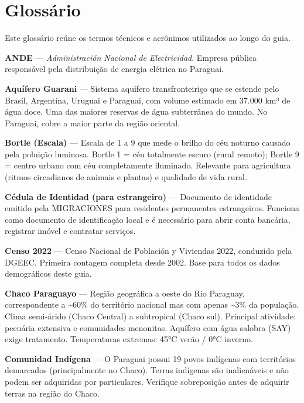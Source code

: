 \chapter*{Glossário}
\label{chap:glossario}

\small

\noindent Este glossário reúne os termos técnicos e acrônimos utilizados ao longo do guia.

\bigskip

\noindent\textbf{ANDE} — \textit{Administración Nacional de Electricidad}. Empresa pública responsável pela distribuição de energia elétrica no Paraguai.

\medskip
\noindent\textbf{Aquífero Guarani} — Sistema aquífero transfronteiriço que se estende pelo Brasil, Argentina, Uruguai e Paraguai, com volume estimado em 37.000 km³ de água doce. Uma das maiores reservas de água subterrânea do mundo. No Paraguai, cobre a maior parte da região oriental.

\medskip
\noindent\textbf{Bortle (Escala)} — Escala de 1 a 9 que mede o brilho do céu noturno causado pela poluição luminosa. Bortle 1 = céu totalmente escuro (rural remoto); Bortle 9 = centro urbano com céu completamente iluminado. Relevante para agricultura (ritmos circadianos de animais e plantas) e qualidade de vida rural.

\medskip
\noindent\textbf{Cédula de Identidad (para estrangeiro)} — Documento de identidade emitido pela MIGRACIONES para residentes permanentes estrangeiros. Funciona como documento de identificação local e é necessário para abrir conta bancária, registrar imóvel e contratar serviços.

\medskip
\noindent\textbf{Censo 2022} — Censo Nacional de Población y Viviendas 2022, conduzido pela DGEEC. Primeira contagem completa desde 2002. Base para todos os dados demográficos deste guia.

\medskip
\noindent\textbf{Chaco Paraguayo} — Região geográfica a oeste do Rio Paraguay, correspondente a \textasciitilde{}60\% do território nacional mas com apenas \textasciitilde{}3\% da população. Clima semi-árido (Chaco Central) a subtropical (Chaco sul). Principal atividade: pecuária extensiva e comunidades menonitas. Aquífero com água salobra (SAY) exige tratamento. Temperaturas extremas: 45°C verão / 0°C inverno.

\medskip
\noindent\textbf{Comunidad Indígena} — O Paraguai possui 19 povos indígenas com territórios demarcados (principalmente no Chaco). Terras indígenas são inalienáveis e não podem ser adquiridas por particulares. Verifique sobreposição antes de adquirir terras na região do Chaco.


